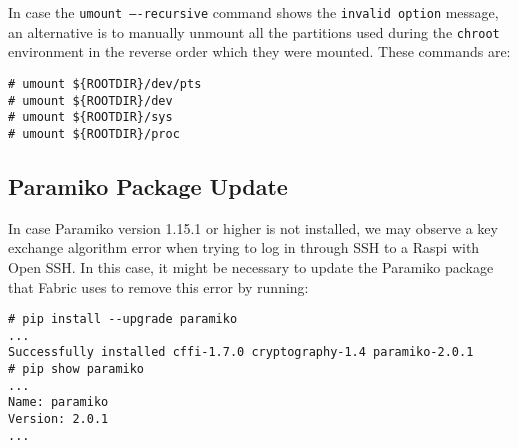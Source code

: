 
In case the \texttt{umount ----recursive} command shows the \texttt{invalid option}
message, an alternative is to manually unmount all the partitions used
during the \texttt{chroot} environment in the reverse order which they were mounted.
These commands are:

\begin{lstlisting}[]
# umount ${ROOTDIR}/dev/pts
# umount ${ROOTDIR}/dev
# umount ${ROOTDIR}/sys
# umount ${ROOTDIR}/proc
\end{lstlisting}
\FloatBarrier
\vspace{-5mm}

\subsection{Paramiko Package Update}
\label{sec:paramiko}
In case Paramiko version 1.15.1 or higher is not installed, we may observe
a key exchange algorithm error when trying to log in through \ac{SSH} to a
Raspi with Open SSH. In this case, it might be necessary to update the Paramiko
package that Fabric uses to remove this error by running:

\begin{lstlisting}[]
# pip install --upgrade paramiko
...
Successfully installed cffi-1.7.0 cryptography-1.4 paramiko-2.0.1
# pip show paramiko
...
Name: paramiko
Version: 2.0.1
...
\end{lstlisting}
\FloatBarrier
\vspace{-5mm}
